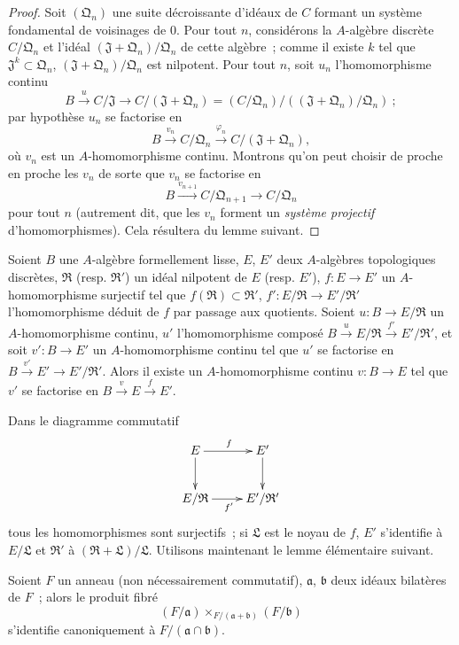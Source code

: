 \begin{proof}
Soit $(\mathfrak Q_n)$ une suite décroissante d'idéaux de $C$ formant un
système fondamental de voisinages de $0$. Pour tout $n$, considérons la
$A$-algèbre discrète $C/\mathfrak Q_n$ et l'idéal
$(\mathfrak J+\mathfrak Q_n)/\mathfrak Q_n$ de cette algèbre~; comme il
existe $k$ tel que $\mathfrak J^k\subset\mathfrak Q_n$,
$(\mathfrak J+\mathfrak Q_n)/\mathfrak Q_n$ est nilpotent. Pour tout
$n$, soit $u_n$ l'homomorphisme continu
\[
  B\xrightarrow{u}C/\mathfrak J\to C/(\mathfrak J+\mathfrak Q_n)
  =(C/\mathfrak Q_n)/((\mathfrak J+\mathfrak Q_n)/\mathfrak Q_n)~;
\]
par hypothèse $u_n$ se factorise en
\[
  B\xrightarrow{v_n}C/\mathfrak Q_n
  \xrightarrow{\varphi_n}C/(\mathfrak J+\mathfrak Q_n),
\]
où $v_n$ est un $A$-homomorphisme continu. Montrons qu'on peut choisir de
proche en proche les $v_n$ de sorte que $v_n$ se factorise en
\[
  B\xrightarrow{v_{n+1}}C/\mathfrak Q_{n+1}\to C/\mathfrak Q_n
\]
pour tout $n$ (autrement dit, que les $v_n$ forment un \emph{système
projectif} d'homomorphismes). Cela résultera du lemme suivant.
\end{proof}

\begin{lemma}[19.3.10.1]
\label{0.19.3.10.1-fr}
Soient $B$ une $A$-algèbre formellement lisse, $E$, $E'$ deux $A$-algèbres
topologiques discrètes, $\mathfrak R$ (resp. $\mathfrak R'$) un idéal
nilpotent de $E$ (resp. $E'$), $f:E\to E'$ un $A$-homomorphisme surjectif tel
que $f(\mathfrak R)\subset\mathfrak R'$, $f':E/\mathfrak R\to
E'/\mathfrak R'$ l'homomorphisme déduit de $f$ par passage aux quotients.
Soient $u:B\to E/\mathfrak R$ un $A$-homomorphisme continu, $u'$
l'homomorphisme composé
$B\xrightarrow{u}E/\mathfrak R\xrightarrow{f'}E'/\mathfrak R'$, et soit
$v':B\to E'$ un $A$-homomorphisme continu tel que $u'$ se factorise en
$B\xrightarrow{v'}E'\to E'/\mathfrak R'$. Alors il existe un
$A$-homomorphisme continu $v:B\to E$ tel que $v'$ se factorise en
$B\xrightarrow{v}E\xrightarrow{f}E'$.
\end{lemma}

Dans le diagramme commutatif
\[
\xymatrix{
  E \ar[r]^f \ar[d] & E' \ar[d] \\
  E/\mathfrak R \ar[r]_{f'} & E'/\mathfrak R'
}
\]
tous les homomorphismes sont surjectifs~; si $\mathfrak L$ est le noyau de
$f$, $E'$ s'identifie à $E/\mathfrak L$ et $\mathfrak R'$ à
$(\mathfrak R+\mathfrak L)/\mathfrak L$. Utilisons maintenant le lemme
élémentaire suivant.

\begin{lemma}[19.3.10.2]
\label{0.19.3.10.2-fr}
Soient $F$ un anneau (non nécessairement commutatif), $\mathfrak a$,
$\mathfrak b$ deux idéaux bilatères de $F$~; alors le produit fibré
\[
  (F/\mathfrak a)\times_{F/(\mathfrak a+\mathfrak b)}(F/\mathfrak b)
\]
s'identifie canoniquement à $F/(\mathfrak a\cap\mathfrak b)$.
\end{lemma}

